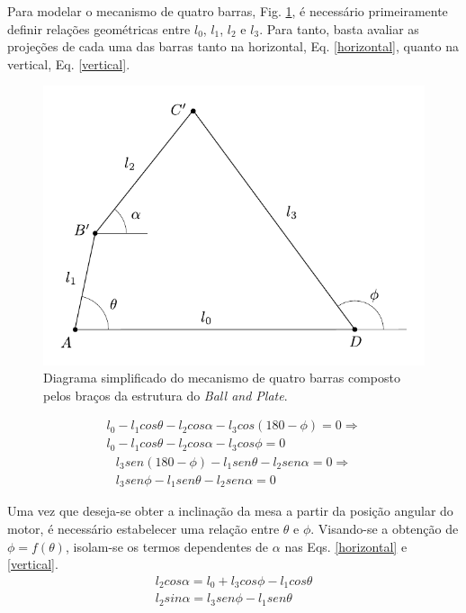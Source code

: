 \documentclass[12pt]{article}
\begin{document}
	Para modelar o mecanismo de quatro barras, Fig. \ref{4link}, é necessário primeiramente definir relações geométricas entre $ l_0 $, $ l_1 $, $ l_2 $ e $ l_3 $. Para tanto, basta avaliar as projeções de cada uma das barras tanto na horizontal, Eq. \ref{horizontal}, quanto na vertical, Eq. \ref{vertical}.
	\begin{figure}[H]
		\centering
		\includegraphics[width=0.6\linewidth]{figuras/4link.pdf}
		\caption{Diagrama simplificado do mecanismo de quatro barras composto pelos braços da estrutura do \textit{Ball and Plate}.}
		\label{4link}
	\end{figure}
	\begin{equation}
		\label{horizontal}
		\begin{gathered}
			l_0 - l_1 cos \theta - l_2 cos \alpha - l_3 cos(180 - \phi) = 0 \Rightarrow \\
			l_0 - l_1 cos \theta - l_2 cos \alpha - l_3 cos \phi = 0 
		\end{gathered}
	\end{equation}
	\begin{equation}
		\label{vertical}
		\begin{gathered}
			l_3 sen(180 - \phi) - l_1 sen\theta - l_2 sen \alpha = 0 \Rightarrow \\
			l_3 sen \phi - l_1 sen\theta - l_2 sen \alpha = 0
		\end{gathered}
	\end{equation}

	Uma vez que deseja-se obter a inclinação da mesa a partir da posição angular do motor, é necessário estabelecer uma relação entre $ \theta $ e $ \phi $. Visando-se a obtenção de $ \phi = f(\theta) $, isolam-se os termos dependentes de $\alpha$ nas Eqs. \ref{horizontal} e \ref{vertical}.
	\begin{equation}
		\label{isolaAlfa}
		\begin{gathered}
			l_2 cos \alpha = l_0 + l_3 cos \phi - l_1 cos \theta \\
			l_2 sin \alpha = l_3 sen \phi - l_1 sen \theta
		\end{gathered}
	\end{equation}
	
\end{document}

